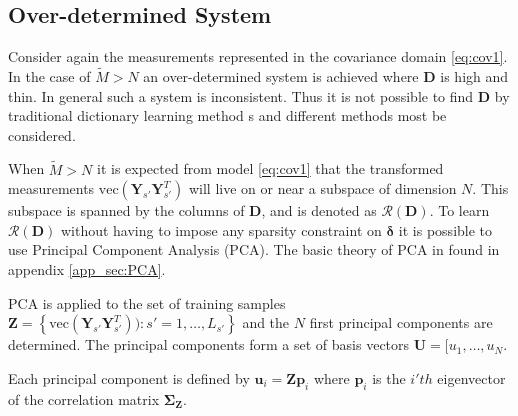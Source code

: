 \subsection{Over-determined System}\label{sec:over_det}
Consider again the measurements represented in the covariance domain \eqref{eq:cov1}.
In the case of $\widetilde{M} > N$ an over-determined system is achieved where $\textbf{D}$ is high and thin. In general such a system is inconsistent. Thus it is not possible to find $\textbf{D}$ by traditional dictionary learning method	s and different methods most be considered.

When $ \widetilde{M} > N $ it is expected from model \eqref{eq:cov1} that the transformed measurements $\text{vec}\left( \mathbf{Y}_{s'} \mathbf{Y}_{s'}^T \right)$ will live on or near a subspace of dimension $N$. 
This subspace is spanned by the columns of $\textbf{D}$, and is denoted as $\mathcal{R}(\textbf{D})$. 
To learn $\mathcal{R}(\textbf{D})$ without having to impose any sparsity constraint on $\boldsymbol{\delta}$ it is possible to use Principal Component Analysis (PCA). The basic theory of PCA in found in appendix \ref{app_sec:PCA}. 

PCA is applied to the set of training samples $\textbf{Z} = \left\{\text{vec}\left( \mathbf{Y}_{s'} \mathbf{Y}_{s'}^T \right)) : s' = 1, \hdots, L_{s'} \right\}$ and the $N$ first principal components are determined. The principal components form a set of basis vectors $\textbf{U}=[u_1,\hdots, u_N$. 


Each principal component is defined by $\textbf{u}_i = \textbf{Z}\textbf{p}_i$ where $\textbf{p}_i$ is the $i'th$ eigenvector of the correlation matrix $\boldsymbol{\Sigma}_{\textbf{Z}}$. 

